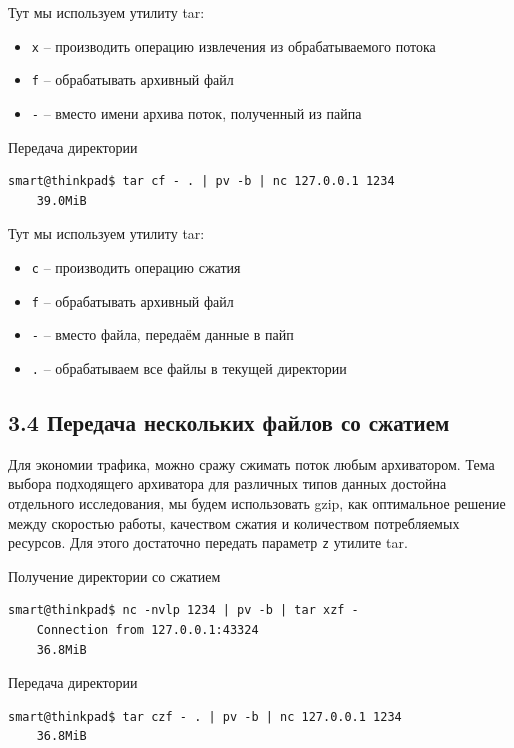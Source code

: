 Тут мы используем утилиту tar:

\begin{itemize}
    \item \texttt{x} -- производить операцию извлечения из обрабатываемого потока
    \item \texttt{f} -- обрабатывать архивный файл
    \item \texttt{-} -- вместо имени архива поток, полученный из пайпа
\end{itemize}

Передача директории
\begin{Verbatim}[frame=single]
    smart@thinkpad$ tar cf - . | pv -b | nc 127.0.0.1 1234
    39.0MiB
\end{Verbatim}

Тут мы используем утилиту tar:

\begin{itemize}
    \item \texttt{с} -- производить операцию сжатия
    \item \texttt{f} -- обрабатывать архивный файл
    \item \texttt{-} -- вместо файла, передаём данные в пайп
    \item \texttt{.} -- обрабатываем все файлы в текущей директории
\end{itemize}

\subsection*{3.4 Передача нескольких файлов со сжатием}

Для экономии трафика, можно сражу сжимать поток любым архиватором. Тема выбора подходящего архиватора для различных типов данных достойна отдельного исследования, мы будем использовать gzip, как оптимальное решение между скоростью работы, качеством сжатия и количеством потребляемых ресурсов. Для этого достаточно передать параметр \texttt{z} утилите tar.

Получение директории со сжатием
\begin{Verbatim}[frame=single]
    smart@thinkpad$ nc -nvlp 1234 | pv -b | tar xzf -
    Connection from 127.0.0.1:43324
    36.8MiB
\end{Verbatim}

Передача директории
\begin{Verbatim}[frame=single]
    smart@thinkpad$ tar czf - . | pv -b | nc 127.0.0.1 1234
    36.8MiB
\end{Verbatim}

